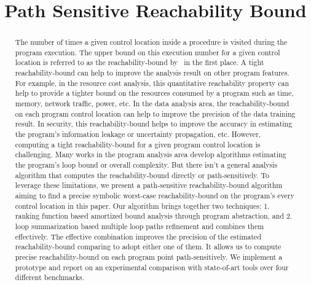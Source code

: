 \documentclass[a4paper,11pt]{article}
\begin{document}
\title{Path Sensitive Reachability Bound}

\author{}

\date{}

\maketitle
%
\begin{abstract}
    The number of times a given control location 
    inside a procedure is visited during the program execution.
    The upper bound on this execution number for 
    a given control location is referred to as the reachability-bound by~\cite{GulwaniZ10} in the first place.
    A tight reachability-bound
    can help to improve the analysis result on other program features.
    For example, in the resource cost analysis, this quantitative reachability property
    can help to provide a tighter
    bound on the resources consumed by a program such as time, memory,
    network traffic, power, etc.
    In the data analysis area,
    the reachability-bound on each program control location
    can help to improve the precision of the data training result. 
    In security, this reachability-bound helps to improve the accuracy
    in estimating the program's information leakage or uncertainty propagation, etc.
    However, computing a tight reachability-bound for a given program control location is challenging.
    Many works in the program analysis area develop algorithms estimating the program's loop bound or overall complexity.
    But there isn't a general analysis algorithm that
    computes the reachability-bound
    directly or path-sensitively.
    To leverage these limitations,
    we present a path-sensitive reachability-bound algorithm
    aiming to find a precise symbolic worst-case reachability-bound on the program's every control location in this paper.
    Our algorithm brings together two techniques:
    1. ranking function based amortized bound analysis through program abstraction, and
    2. loop summarization based multiple loop paths refinement
    and combines them effectively. 
    The effective combination improves the precision of the estimated reachability-bound comparing to adopt either one of them.
    It allows us to compute precise reachability-bound on each program point path-sensitively.
    We implement a prototype and report on an experimental comparison with state-of-art tools over four different benchmarks.
\end{abstract}

\tableofcontents
\end{document}
